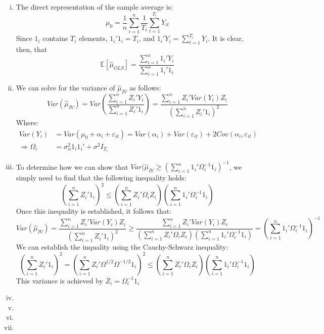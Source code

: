 \documentclass{article}
\newcommand{\sumn}{\sum_{i=1}^{n}}
\newcommand{\E}[1]{\mathbb{E}\left[#1\right]}%
\begin{document}
\begin{enumerate}[(i)]
	\item The direct representation of the sample average is:
		\[
			\mu_0 = \frac{1}{n}\sumn \frac{1}{T_i}\sum_{t=1}^{T_i} Y_{it}
		\]
		Since $1_i$ contains $T_i$ elements, ${1_i'1_i=T_i}$, and ${1_i'Y_i=\sum_{t=1}^{T_i}Y_i}$. It is clear, then, that
		\[
			\E{\hat{\mu}_{OLS}} = \frac{\sumn 1_i'Y_i}{\sumn1_i'1_i}
		\]
	
	
	\item We can solve for the variance of $\hat{\mu}_{IV}$ as follows:
		\[
			Var(\hat{\mu}_{IV})	= Var\left(\frac{\sumn Z_i'Y_i}{\sumn Z_i'1_i}\right) = \frac{\sumn Z_i'Var(Y_i)Z_i}{\left(\sumn Z_i'1_i\right)^2}	
		\]
		Where:
		\begin{align*}
						Var(Y_i) 	&= Var(\mu_0 + \alpha_i + \varepsilon_{it}) = Var(\alpha_i) + Var(\varepsilon_{it}) + 2Cov(\alpha_i,\varepsilon_{it})	\\
			\Rightarrow \Omega_i	&= \sigma^2_\alpha1_i1_i' + \sigma^2I_{T_i}
		\end{align*}
	
	
	\item To determine how we can show that ${Var(\hat{\mu}_{IV}\geq\left(\sumn 1_i'\Omega_i^{-1}1_i\right)^{-1}}$, we simply need to find that the following inequality holds:
		\[
			\left(\sumn Z_i'1_i\right)^2 \leq \left(\sumn Z_i'\Omega_iZ_i\right)\left(\sumn 1_i'\Omega_i^{-1}1_i\right)
		\]
		Once this inequality is established, it follows that:
		{\small \[
			Var(\hat{\mu}_{IV})	= 		\frac{\sumn Z_i'Var(Y_i)Z_i}{\left(\sumn Z_i'1_i\right)^2}
								\geq 	\frac{\sumn Z_i'Var(Y_i)Z_i}{\left(\sumn Z_i'\Omega_iZ_i\right)\left(\sumn 1_i'\Omega_i^{-1}1_i\right)}
								= 		\left(\sumn 1_i'\Omega_i^{-1}1_i\right)^{-1}
		\] }
		We can establish the inquality using the Cauchy-Schwarz inequality:
		\[
			\left(\sumn Z_i'1_i\right)^2 = 		\left(\sumn Z_i'\Omega^{1/2}\Omega^{-1/2}1_i\right)^2  					
										 \leq 	\left(\sumn Z_i'\Omega_iZ_i\right)\left(\sumn 1_i'\Omega_i^{-1}1_i\right)
		\]
		This variance is achieved by ${\overline{Z}_i=\Omega_i^{-1}1_i}$
		
	\item %
	
	
	
	\item 
	
	
	\item 
	
	
	\item 
	
	
\end{enumerate}
\end{document}
